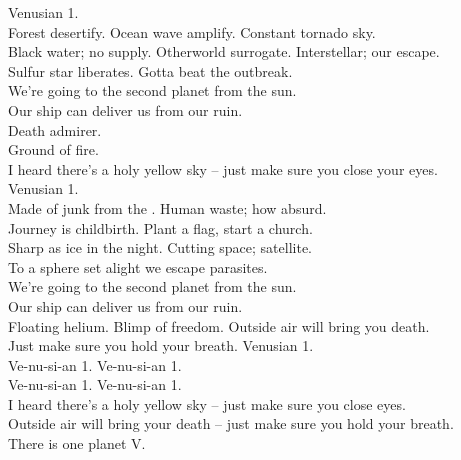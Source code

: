 Venusian 1. \\

Forest desertify. Ocean wave amplify. Constant tornado sky. \\
Black water; no supply. Otherworld surrogate. Interstellar; our escape. \\
Sulfur star liberates. Gotta beat the outbreak. \\

We're going to the second planet from the sun. \\
Our ship can deliver us from our ruin. \\

Death admirer. \\
Ground of fire. \\
I heard there's a holy yellow sky -- just make sure you close your eyes. \\
Venusian 1. \\

Made of junk from the . Human waste; how absurd. \\
Journey is childbirth. Plant a flag, start a church. \\
Sharp as ice in the night. Cutting space; satellite. \\
To a sphere set alight we escape parasites. \\

We're going to the second planet from the sun. \\
Our ship can deliver us from our ruin. \\

Floating helium. Blimp of freedom. Outside air will bring you death. \\
Just make sure you hold your breath. Venusian 1. \\

Ve-nu-si-an 1. Ve-nu-si-an 1. \\
Ve-nu-si-an 1. Ve-nu-si-an 1. \\

I heard there's a holy yellow sky -- just make sure you close eyes. \\
Outside air will bring your death -- just make sure you hold your breath. \\

There is one planet V. \\



